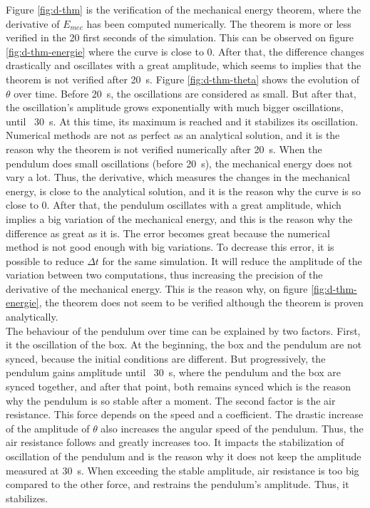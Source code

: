 \documentclass[a4paper,12pt,twoside]{article}
\begin{document}
Figure \ref{fig:d-thm} is the verification of the mechanical energy theorem, where the derivative of $E_{mec}$ has been computed numerically.
The theorem is more or less verified in the \num{20} first seconds of the simulation.
This can be observed on figure \ref{fig:d-thm-energie} where the curve is close to 0.
After that, the difference changes drastically and oscillates with a great amplitude, which seems to implies that the theorem is not verified after \SI{20}{\s}.
Figure \ref{fig:d-thm-theta} shows the evolution of $\theta$ over time.
Before \SI{20}{\s}, the oscillations are considered as small.
But after that, the oscillation's amplitude grows exponentially with much bigger oscillations, until ~\SI{30}{\s}.
At this time, its maximum is reached and it stabilizes its oscillation.\\

Numerical methods are not as perfect as an analytical solution, and it is the reason why the theorem is not verified numerically after \SI{20}{\s}.
When the pendulum does small oscillations (before \SI{20}{\s}), the mechanical energy does not vary a lot.
Thus, the derivative, which measures the changes in the mechanical energy, is close to the analytical solution, and it is the reason why the curve is so close to 0.
After that, the pendulum oscillates with a great amplitude, which implies a big variation of the mechanical energy, and this is the reason why the difference as great as it is.
The error becomes great because the numerical method is not good enough with big variations.
To decrease this error, it is possible to reduce $\Delta t$ for the same simulation.
It will reduce the amplitude of the variation between two computations, thus increasing the precision of the derivative of the mechanical energy.
This is the reason why, on figure \ref{fig:d-thm-energie}, the theorem does not seem to be verified although the theorem is proven analytically.\\

The behaviour of the pendulum over time can be explained by two factors.
First, it the oscillation of the box.
At the beginning, the box and the pendulum are not synced, because the initial conditions are different.
But progressively, the pendulum gains amplitude until ~\SI{30}{\s}, where the pendulum and the box are synced together, and after that point, both remains synced which is the reason why the pendulum is so stable after a moment.
The second factor is the air resistance.
This force depends on the speed and a coefficient.
The drastic increase of the amplitude of $\theta$ also increases the angular speed of the pendulum.
Thus, the air resistance follows and greatly increases too.
It impacts the stabilization of oscillation of the pendulum and is the reason why it does not keep the amplitude measured at \SI{30}{\s}.
When exceeding the stable amplitude, air resistance is too big compared to the other force, and restrains the pendulum's amplitude.
Thus, it stabilizes.\\
\end{document}
